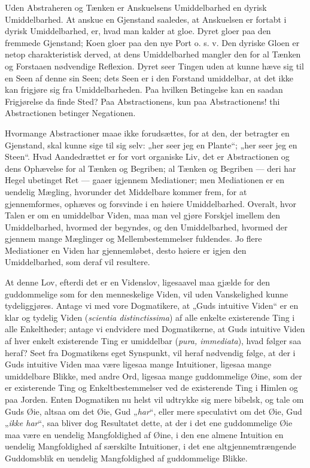 \documentclass[11pt]{book}
\newcommand{\opage}[1]{\marginnote{\footnotesize\textit{[#1]}}}
\begin{document}
Uden Abstraheren og Tænken er Anskuelsens Umiddelbarhed en dyrisk
Umiddelbarhed. At anskue en Gjenstand saaledes, at Anskuelsen er fortabt
i dyrisk Umiddelbarhed, er, hvad man kalder at gloe. Dyret gloer paa den
fremmede Gjenstand; Koen gloer paa den nye Port o. s. v. Den dyriske
Gloen er netop charakteristisk derved, at dens Umiddelbarhed mangler den
for al Tænken og Forstaaen nødvendige Reflexion. Dyret seer Tingen uden
at kunne hæve sig til en Seen af denne sin Seen; dets Seen er i den
Forstand umiddelbar, at det ikke kan frigjøre sig fra Umiddelbarheden.
Paa hvilken Betingelse kan en saadan Frigjørelse da finde Sted? Paa
Abstractionens, kun paa Abstractionens! thi Abstractionen betinger
Negationen.

Hvormange Abstractioner maae ikke forudsættes, for at den, der betragter
en Gjenstand, skal kunne sige til sig selv: „her seer jeg en Plante“;
„her seer jeg en Steen“. Hvad Aandedrættet er for vort organiske Liv,
det er Abstractionen og dens Ophævelse for al Tænken og Begriben; al
Tænken og Begriben --- deri har Hegel ubetinget Ret --- gaaer igjennem
Mediationer; men Mediationen er en uendelig Mægling, hvorunder det
Middelbare kommer frem, for at gjennemformes, ophæves og forsvinde i en
høiere Umiddelbarhed. Overalt, hvor Talen er om en umiddelbar Viden, maa
man vel gjøre Forskjel imellem den Umiddelbarhed, hvormed der begyndes,
og den Umiddelbarhed, hvormed der
\opage{242} \setcounter{footnote}{0}%
gjennem mange Mæglinger og Mellembestemmelser fuldendes. Jo flere
Mediationer en Viden har gjennemløbet, desto høiere er igjen den
Umiddelbarhed, som deraf vil resultere.

At denne Lov, efterdi det er en Videnslov, ligesaavel maa gjælde for den
guddommelige som for den menneskelige Viden, vil uden Vanskelighed kunne
tydeliggjøres. Antage vi med vore Dogmatikere, at „Guds intuitive Viden“
er en klar og tydelig Viden (\textit{scientia distinctissima}) af alle
enkelte existerende Ting i alle Enkeltheder; antage vi endvidere med
Dogmatikerne, at Guds intuitive Viden af hver enkelt existerende Ting er
umiddelbar (\textit{pura, immediata}), hvad følger saa heraf? Seet fra
Dogmatikens eget Synspunkt, vil heraf nødvendig følge, at der i Guds
intuitive Viden maa være ligesaa mange Intuitioner, ligesaa mange
umiddelbare Blikke, med andre Ord, ligesaa mange guddommelige Øine, som
der er existerende Ting og Enkeltbestemmelser ved de existerende Ting i
Himlen og paa Jorden. Enten Dogmatiken nu helst vil udtrykke sig mere
bibelsk, og tale om Guds Øie, altsaa om det Øie, Gud „\emph{har}“,
eller mere speculativt om det Øie, Gud „\emph{ikke har}“, saa bliver dog
Resultatet dette, at der i det ene guddommelige Øie maa være en uendelig
Mangfoldighed af Øine, i den ene almene Intuition en uendelig
Mangfoldighed af særskilte Intuitioner, i det ene altgjennemtrængende
Guddomsblik en uendelig Mangfoldighed af guddommelige Blikke.
\end{document}
